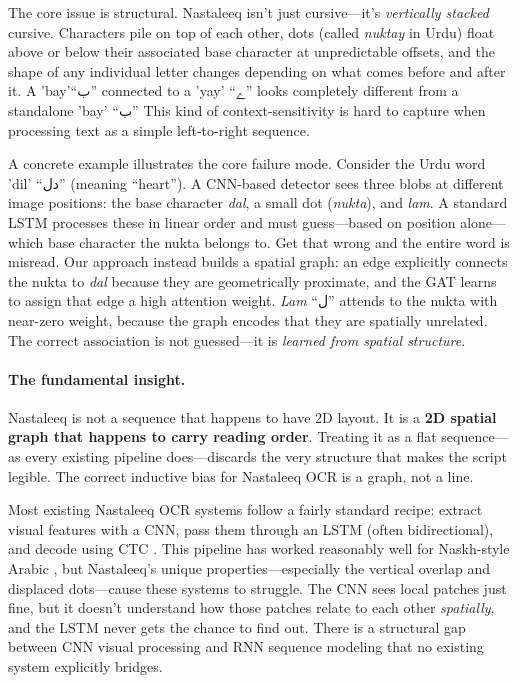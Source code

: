 \documentclass[11pt]{article}
\begin{document}
The core issue is structural. Nastaleeq isn't just cursive---it's \emph{vertically
stacked} cursive.
Characters pile on top of each other, dots (called \textit{nuktay} in Urdu) float above
or below their associated base character at unpredictable offsets, and the shape of any
individual letter changes depending on what comes before and after it.
A 'bay'``{\urdufont ب}'' connected to a 'yay' ``{\urdufont ے}''  looks completely different from a standalone 'bay' ``{\urdufont ب}''  This kind of context-sensitivity is hard to capture when processing text as a simple
left-to-right sequence.

A concrete example illustrates the core failure mode.
Consider the Urdu word 'dil' ``{\urdufont دل}''  (meaning ``heart'').
A CNN-based detector sees three blobs at different image positions: the base character
\textit{dal}, a small dot (\textit{nukta}), and \textit{lam}.
A standard LSTM processes these in linear order and must guess---based on position
alone---which base character the nukta belongs to.
Get that wrong and the entire word is misread.
Our approach instead builds a spatial graph: an edge explicitly connects the nukta to
\textit{dal} because they are geometrically proximate, and the GAT learns to assign that
edge a high attention weight.
\textit{Lam} ``{\urdufont ل}''  attends to the nukta with near-zero weight, because the graph encodes
that they are spatially unrelated.
The correct association is not guessed---it is \emph{learned from spatial structure}.

\paragraph{The fundamental insight.}
Nastaleeq is not a sequence that happens to have 2D layout.
It is a \textbf{2D spatial graph that happens to carry reading order}.
Treating it as a flat sequence---as every existing pipeline does---discards the very
structure that makes the script legible.
The correct inductive bias for Nastaleeq OCR is a graph, not a line.

Most existing Nastaleeq OCR systems follow a fairly standard recipe: extract visual
features with a CNN, pass them through an LSTM (often bidirectional), and decode using
CTC \citep{graves2006ctc}.
This pipeline has worked reasonably well for Naskh-style Arabic
\citep{bluche2017gated}, but Nastaleeq's unique properties---especially the vertical
overlap and displaced dots---cause these systems to struggle.
The CNN sees local patches just fine, but it doesn't understand how those patches
relate to each other \emph{spatially}, and the LSTM never gets the chance to find out.
There is a structural gap between CNN visual processing and RNN sequence modeling that
no existing system explicitly bridges.
\end{document}
